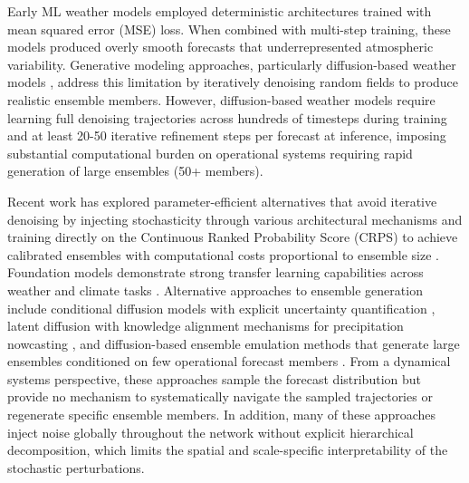 \documentclass[11pt]{article}
\begin{document}
Early ML weather models employed deterministic architectures trained with mean squared error (MSE) loss. When combined with multi-step training, these models produced overly smooth forecasts that underrepresented atmospheric variability. Generative modeling approaches, particularly diffusion-based weather models \cite{sohl-dickstein2015deep, ho2020denoising, song2021scorebased, price2025gencast}, address this limitation by iteratively denoising random fields to produce realistic ensemble members. However, diffusion-based weather models \cite{price2025gencast} require learning full denoising trajectories across hundreds of timesteps during training and at least 20-50 iterative refinement steps per forecast at inference, imposing substantial computational burden on operational systems requiring rapid generation of large ensembles (50+ members).

Recent work has explored parameter-efficient alternatives that avoid iterative denoising by injecting stochasticity through various architectural mechanisms and training directly on the Continuous Ranked Probability Score (CRPS) to achieve calibrated ensembles with computational costs proportional to ensemble size \cite{lang2024aifs, alet2024fgn, bonev2025fourcastnet3, fuxi_ens, kochkov2024neuralgcm}. Foundation models demonstrate strong transfer learning capabilities across weather and climate tasks \cite{nguyen2023climax, bodnar2025aurora, allen2025aardvark}. Alternative approaches to ensemble generation include conditional diffusion models with explicit uncertainty quantification \cite{shi2025codicast}, latent diffusion with knowledge alignment mechanisms for precipitation nowcasting \cite{gao2023prediff}, and diffusion-based ensemble emulation methods that generate large ensembles conditioned on few operational forecast members \cite{price2024seeds}. From a dynamical systems perspective, these approaches sample the forecast distribution but provide no mechanism to systematically navigate the sampled trajectories or regenerate specific ensemble members. In addition, many of these approaches inject noise globally throughout the network without explicit hierarchical decomposition, which limits the spatial and scale-specific interpretability of the stochastic perturbations.  
\end{document}
